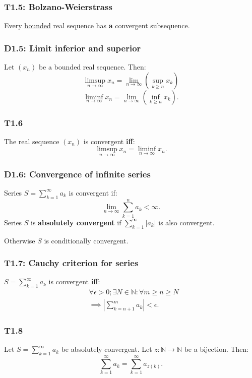 \documentclass{article}
\begin{document}
\begin{multicols*}{3}
\subsubsection*{T1.5: Bolzano-Weierstrass}
Every \underline{bounded} real sequence has \textbf{a}
convergent subsequence.

\subsubsection*{D1.5: Limit inferior and superior}
Let $(x_n)$ be a bounded real sequence. Then:
$$\limsup_{n\rightarrow\infty}x_n
=\lim_{n\rightarrow\infty}\left(\sup_{k\geq n}x_k\right)$$
$$\liminf_{n\rightarrow\infty}x_n
=\lim_{n\rightarrow\infty}\left(\inf_{k\geq n}x_k\right).$$

\subsubsection*{T1.6}
The real sequence $(x_n)$ is convergent \textbf{iff}:
$$\limsup_{n\rightarrow\infty}x_n
=\liminf_{n\rightarrow\infty}x_n.$$

\subsubsection*{D1.6: Convergence of infinite series}
Series $\displaystyle S=\sum_{k=1}^{\infty}a_k$ is
convergent if:
$$\lim_{n\rightarrow\infty}\sum_{k=1}^{n}a_k<\infty.$$
Series $S$ is \textbf{absolutely convergent} if
$\displaystyle\sum_{k=1}^{\infty}|a_k|$ is also convergent.

Otherwise $S$ is conditionally convergent.

\subsubsection*{T1.7: Cauchy criterion for series}
$\displaystyle S=\sum_{k=1}^{\infty}a_k$ is convergent \textbf{iff}:
\begin{align*}
    &\forall\epsilon>0; \exists N\in\mathbb{N}:
    \forall m\geq n\geq N \\
    &\implies \left|\sum_{k=n+1}^{m}a_k\right|<\epsilon.
\end{align*}

\subsubsection*{T1.8}
Let $\displaystyle S=\sum_{k=1}^{\infty}a_k$
be absolutely convergent. Let $z:\mathbb{N}
\rightarrow\mathbb{N}$ be a bijection. Then:
$$\sum_{k=1}^{\infty}a_k
=\sum_{k=1}^{\infty}a_{z(k)}.$$


\end{multicols*}
\end{document}
